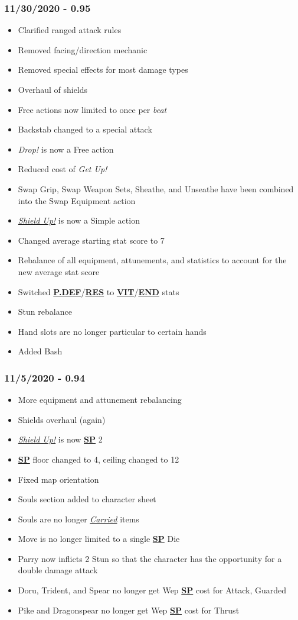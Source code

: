 \documentclass[12pt]{article}
\newcommand{\refto}[1]{\hyperlink{#1}{\textbf{#1}}}
\newcommand{\reftoit}[1]{\hyperlink{#1}{\emph{#1}}}
\begin{document}
\begin{multicols*}{2}
\subsubsection*{11/30/2020 - 0.95}
\begin{itemize}
\item Clarified ranged attack rules
\item Removed facing/direction mechanic
\item Removed special effects for most damage types
\item Overhaul of shields
\item Free actions now limited to once per \emph{beat}
\item Backstab changed to a special attack
\item \emph{Drop!} is now a Free action
\item Reduced cost of \emph{Get Up!}
\item Swap Grip, Swap Weapon Sets, Sheathe, and Unseathe have been combined into the Swap Equipment action
\item \reftoit{Shield Up!} is now a Simple action
\item Changed average starting stat score to 7
\item Rebalance of all equipment, attunements, and statistics to account for the new average stat score
\item Switched \refto{P.DEF}/\refto{RES} to \refto{VIT}/\refto{END} stats
\item Stun rebalance
\item Hand slots are no longer particular to certain hands
\item Added Bash
\end{itemize}
\subsubsection*{11/5/2020 - 0.94}
\begin{itemize}
\item More equipment and attunement rebalancing
\item Shields overhaul (again)
\item \reftoit{Shield Up!} is now \refto{SP} 2
\item \refto{SP} floor changed to 4, ceiling changed to 12
\item Fixed map orientation
\item Souls section added to character sheet
\item Souls are no longer \reftoit{Carried} items
\item Move is no longer limited to a single \refto{SP} Die
\item Parry now inflicts 2 Stun so that the character has the opportunity for a double damage attack
\item Doru, Trident, and Spear no longer get Wep \refto{SP} cost for Attack, Guarded
\item Pike and Dragonspear no longer get Wep \refto{SP} cost for Thrust
\end{itemize}

\end{multicols*}
\end{document}
